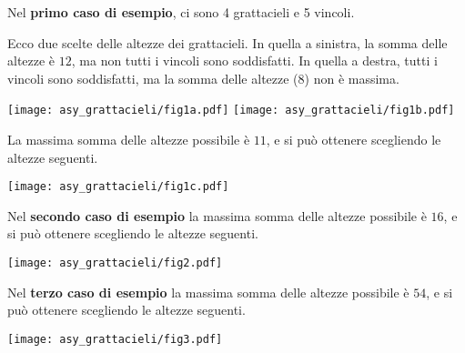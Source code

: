 

\Examples

\begin{example}
%
%
\end{example}

\begin{example}
%
\end{example}



\Explanation

Nel \textbf{primo caso di esempio}, ci sono 4 grattacieli e 5 vincoli.

Ecco due scelte delle altezze dei grattacieli.
In quella a sinistra, la somma delle altezze è $12$, ma non tutti i vincoli sono soddisfatti.
In quella a destra, tutti i vincoli sono soddisfatti, ma la somma delle altezze ($8$) non è massima.

\begin{center}
\hfill
\texttt{[image: asy\_grattacieli/fig1a.pdf]}
\hfill
\texttt{[image: asy\_grattacieli/fig1b.pdf]}
\hfill
\phantom{}
\end{center}

La massima somma delle altezze possibile è
$11$,
e si può ottenere scegliendo le altezze seguenti.

\begin{center}
\texttt{[image: asy\_grattacieli/fig1c.pdf]}
\end{center}

Nel \textbf{secondo caso di esempio} la massima somma delle altezze possibile è
$16$,
e si può ottenere scegliendo le altezze seguenti.

\begin{center}
\texttt{[image: asy\_grattacieli/fig2.pdf]}
\end{center}

Nel \textbf{terzo caso di esempio} la massima somma delle altezze possibile è
$54$,
e si può ottenere scegliendo le altezze seguenti.

\begin{center}
\texttt{[image: asy\_grattacieli/fig3.pdf]}
\end{center}
